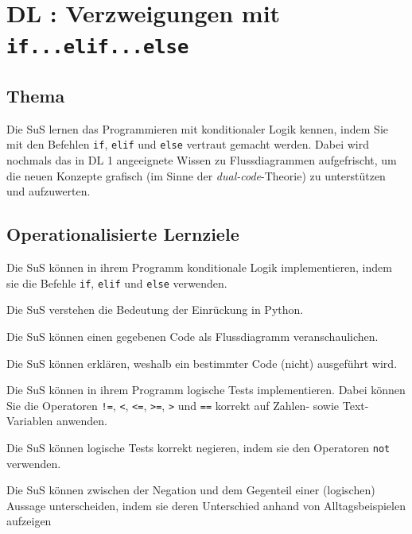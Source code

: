 \section{DL \themycounter: Verzweigungen mit \texorpdfstring{\lstinline|if...elif...else|}{if...elif...else}}
\begin{myExBox}[title=DL \themycounter]
\subsection*{Thema}
Die SuS lernen das Programmieren mit konditionaler Logik kennen, indem Sie mit den Befehlen \lstinline|if|, \lstinline|elif| und \lstinline|else| vertraut gemacht werden. Dabei wird nochmals das in DL 1 angeeignete Wissen zu Flussdiagrammen aufgefrischt, um die neuen Konzepte grafisch (im Sinne der \textit{dual-code}-Theorie) zu unterstützen und aufzuwerten.

\subsection*{Operationalisierte Lernziele}
\begin{todolist}
    \item Die SuS können in ihrem Programm konditionale Logik implementieren, indem sie die Befehle \lstinline|if|, \lstinline|elif| und \lstinline|else| verwenden.
    \item Die SuS verstehen die Bedeutung der Einrückung in Python.
    \item Die SuS können einen gegebenen Code als Flussdiagramm veranschaulichen.
    \item Die SuS können erklären, weshalb ein bestimmter Code (nicht) ausgeführt wird.
    \item Die SuS können in ihrem Programm logische Tests implementieren. Dabei können Sie die Operatoren \lstinline|!=|, \lstinline|<|, \lstinline|<=|, \lstinline|>=|, \lstinline|>| und \lstinline|==| korrekt auf Zahlen- sowie Text-Variablen anwenden.
    \item Die SuS können logische Tests korrekt negieren, indem sie den Operatoren \lstinline|not| verwenden.
    \item Die SuS können zwischen der Negation und dem Gegenteil einer (logischen) Aussage unterscheiden, indem sie deren Unterschied anhand von Alltagsbeispielen aufzeigen
\end{todolist}


\end{myExBox}
